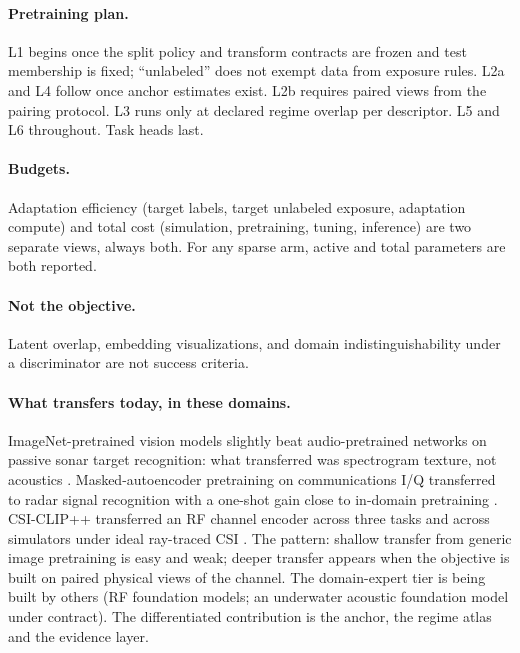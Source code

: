 \documentclass[11pt,a4paper]{article}
\begin{document}
\paragraph{Pretraining plan.} L1 begins once the split policy and transform contracts are frozen and test membership is fixed; ``unlabeled'' does not exempt data from exposure rules. L2a and L4 follow once anchor estimates exist. L2b requires paired views from the pairing protocol. L3 runs only at declared regime overlap per descriptor. L5 and L6 throughout. Task heads last.

\paragraph{Budgets.} Adaptation efficiency (target labels, target unlabeled exposure, adaptation compute) and total cost (simulation, pretraining, tuning, inference) are two separate views, always both. For any sparse arm, active and total parameters are both reported.

\paragraph{Not the objective.} Latent overlap, embedding visualizations, and domain indistinguishability under a discriminator are not success criteria.

\paragraph{What transfers today, in these domains.} ImageNet-pretrained vision models slightly beat audio-pretrained networks on passive sonar target recognition: what transferred was spectrogram texture, not acoustics \citep{mohammadi2024}. Masked-autoencoder pretraining on communications I/Q transferred to radar signal recognition with a one-shot gain close to in-domain pretraining \citep{huang2025}. CSI-CLIP++ transferred an RF channel encoder across three tasks and across simulators under ideal ray-traced CSI \citep{jiang2026}. The pattern: shallow transfer from generic image pretraining is easy and weak; deeper transfer appears when the objective is built on paired physical views of the channel. The domain-expert tier is being built by others (RF foundation models; an underwater acoustic foundation model under contract). The differentiated contribution is the anchor, the regime atlas and the evidence layer.

\end{document}

